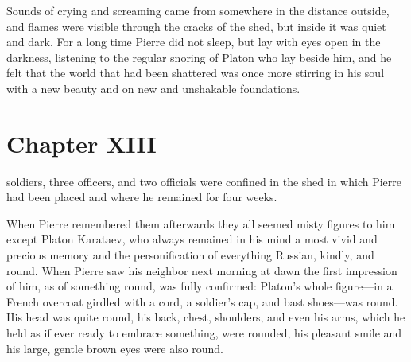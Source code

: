 Sounds of crying and screaming came from somewhere in the
distance outside, and flames were visible through the cracks of
the shed, but inside it was quiet and dark. For a long time
Pierre did not sleep, but lay with eyes open in the darkness,
listening to the regular snoring of Platon who lay beside him,
and he felt that the world that had been shattered was once more
stirring in his soul with a new beauty and on new and unshakable
foundations.


\chapter*{Chapter XIII} \ifaudio {}
\fi

 soldiers, three officers, and two officials were
confined in the shed in which Pierre had been placed and where he
remained for four weeks.

When Pierre remembered them afterwards they all seemed misty
figures to him except Platon Karataev, who always remained in his
mind a most vivid and precious memory and the personification of
everything Russian, kindly, and round. When Pierre saw his
neighbor next morning at dawn the first impression of him, as of
something round, was fully confirmed: Platon's whole figure---in
a French overcoat girdled with a cord, a soldier's cap, and bast
shoes---was round. His head was quite round, his back, chest,
shoulders, and even his arms, which he held as if ever ready to
embrace something, were rounded, his pleasant smile and his
large, gentle brown eyes were also round.

